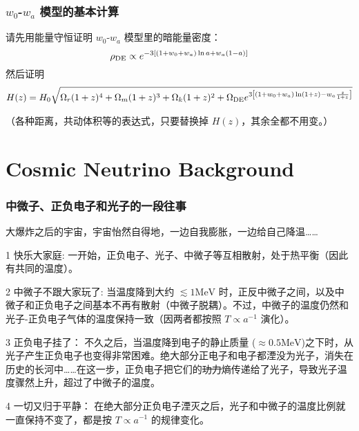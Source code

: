 \documentclass[CJK,13pt]{beamer}
\begin{document}
  \begin{frame}
    \frametitle{$w_0$-$w_a$ 模型的基本计算}
    请先用能量守恒证明 $w_0$-$w_a$ 模型里的暗能量密度：
    $$\rho_{\rm DE} \propto e^{-3\left[(1+w_0+w_a)\ln a + w_a(1-a)\right]}$$
    然后证明
   {\scriptsize $$H(z)=H_0\sqrt{\Omega_r(1+z)^4+\Omega_m(1+z)^3 + \Omega_k(1+z)^2+\Omega_{\rm DE}e^{3\left[(1+w_0+w_a)\ln (1+z) - w_a\frac{z}{1+z}\right]}}$$}

    \skiplines
    
    （各种距离，共动体积等的表达式，只要替换掉 $H(z)$，其余全都不用变。）
  \end{frame}

  \section{Cosmic Neutrino Background}


  \begin{frame}
    \frametitle{中微子、正负电子和光子的一段往事}
    大爆炸之后的宇宙，宇宙怡然自得地，一边自我膨胀，一边给自己降温……
    \bitem
  \item[1]{{\blue 快乐大家庭:} \scriptsize 一开始，正负电子、光子、中微子等互相散射，处于热平衡（因此有共同的温度）。}
  \item[2]{{\blue 中微子不跟大家玩了:} \scriptsize 当温度降到大约 $\lesssim 1\mathrm{MeV}$ 时，正反中微子之间，以及中微子和正负电子之间基本不再有散射（中微子脱耦）。不过，中微子的温度仍然和光子-正负电子气体的温度保持一致（因两者都按照 $T\propto a^{-1}$ 演化）。}
  \item[3]{{\blue 正负电子挂了：} \scriptsize 不久之后，当温度降到电子的静止质量 ($\approx 0.5\mathrm{MeV}$)之下时，从光子产生正负电子也变得非常困难。绝大部分正电子和电子都湮没为光子，消失在历史的长河中……在这一步，正负电子把它们的\sout{功力}熵传递给了光子，导致光子温度骤然上升，超过了中微子的温度。}
  \item[4]{{\blue 一切又归于平静：} \scriptsize 在绝大部分正负电子湮灭之后，光子和中微子的温度比例就一直保持不变了，都是按 $T\propto a^{-1}$ 的规律变化。}    
    \eitem
  \end{frame}
\end{document}
